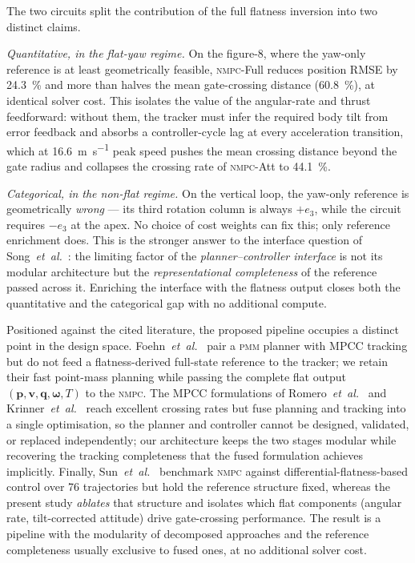 \documentclass{ieeeaccess}
\newcommand{\vect}[1]{\bm{#1}}
\newcommand{\pmm}{\textsc{pmm}}
\newcommand{\nmpc}{\textsc{nmpc}}
\begin{document}
The two circuits split the contribution of the full flatness
inversion into two distinct claims.

\emph{Quantitative, in the flat-yaw regime.}
On the figure-8, where the yaw-only reference is at least
geometrically feasible, \nmpc{}-Full reduces position RMSE by
\SI{24.3}{\percent} and more than halves the mean gate-crossing
distance (\SI{60.8}{\percent}), at identical solver cost.
This isolates the value of the angular-rate and thrust feedforward:
without them, the tracker must infer the required body tilt from
error feedback and absorbs a controller-cycle lag at every
acceleration transition, which at \SI{16.6}{\metre\per\second} peak
speed pushes the mean crossing distance beyond the gate radius and
collapses the crossing rate of \nmpc{}-Att to \SI{44.1}{\percent}.

\emph{Categorical, in the non-flat regime.}
On the vertical loop, the yaw-only reference is geometrically
\emph{wrong} --- its third rotation column is always $+e_3$, while
the circuit requires $-e_3$ at the apex.
No choice of cost weights can fix this; only reference enrichment
does.
This is the stronger answer to the interface question of
Song~\textit{et~al.}~\cite{song2023reaching}: the limiting factor
of the \emph{planner--controller interface} is not its modular
architecture but the \emph{representational completeness} of the
reference passed across it.
Enriching the interface with the flatness output closes both the
quantitative and the categorical gap with no additional compute.

Positioned against the cited literature, the proposed pipeline occupies
a distinct point in the design space.
Foehn~\textit{et~al.}~\cite{foehn2021time} pair a \pmm{} planner with
\mbox{MPCC} tracking but do not feed a flatness-derived full-state
reference to the tracker; we retain their fast point-mass planning while
passing the complete flat output $(\vect{p},\vect{v},\vect{q},
\vect{\omega},T)$ to the \nmpc{}.
The \mbox{MPCC} formulations of
Romero~\textit{et~al.}~\cite{romero2022mpcc} and
Krinner~\textit{et~al.}~\cite{krinner2024mpcc} reach excellent crossing
rates but fuse planning and tracking into a single optimisation, so the
planner and controller cannot be designed, validated, or replaced
independently; our architecture keeps the two stages modular while
recovering the tracking completeness that the fused formulation
achieves implicitly.
Finally, Sun~\textit{et~al.}~\cite{sun2022comparative} benchmark \nmpc{}
against differential-flatness-based control over 76 trajectories but
hold the reference structure fixed, whereas the present study
\emph{ablates} that structure and isolates which flat components
(angular rate, tilt-corrected attitude) drive gate-crossing
performance.
The result is a pipeline with the modularity of decomposed approaches
and the reference completeness usually exclusive to fused ones, at no
additional solver cost.
\end{document}
